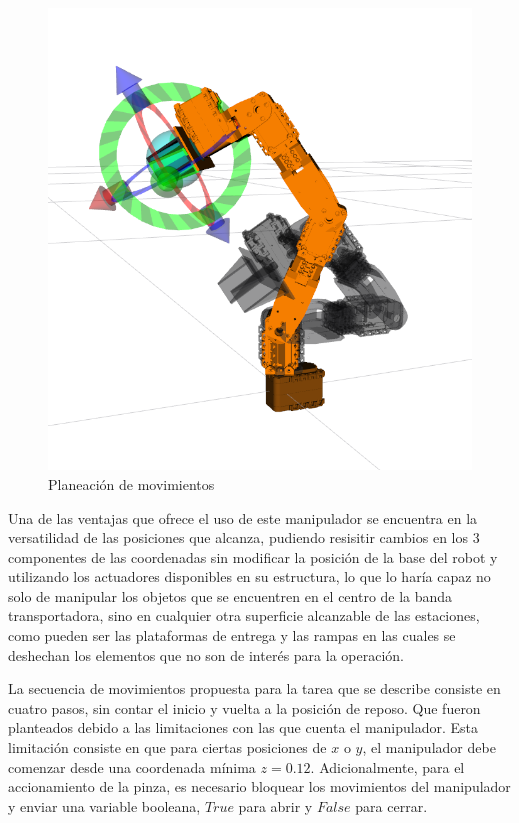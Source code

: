 \begin{figure}[H]
    \centering
    \includegraphics[scale=0.2]{Figures/Arm_MovPlan.png}
        \caption{Planeación de movimientos}
        \label{fig:Arm_MovPlan}
\end{figure}

Una de las ventajas que ofrece el uso de este manipulador se encuentra en la versatilidad de las posiciones que alcanza, pudiendo resisitir cambios en los 3 componentes de las coordenadas sin modificar la posición de la base del robot y utilizando los actuadores disponibles en su estructura, lo que lo haría capaz no solo de manipular los objetos que se encuentren en el centro de la banda transportadora, sino en cualquier otra superficie alcanzable de las estaciones, como pueden ser las plataformas de entrega y las rampas en las cuales se deshechan los elementos que no son de interés para la operación. 

La secuencia de movimientos propuesta para la tarea que se describe consiste en cuatro pasos, sin contar el inicio y vuelta a la posición de reposo. Que fueron planteados debido a las limitaciones con las que cuenta el manipulador. Esta limitación consiste en que para ciertas posiciones de $x$ o $y$, el manipulador debe comenzar desde una coordenada mínima $z = 0.12$. Adicionalmente, para el accionamiento de la pinza, es necesario bloquear los movimientos del manipulador y enviar una variable booleana, $True$ para abrir y $False$ para cerrar.

